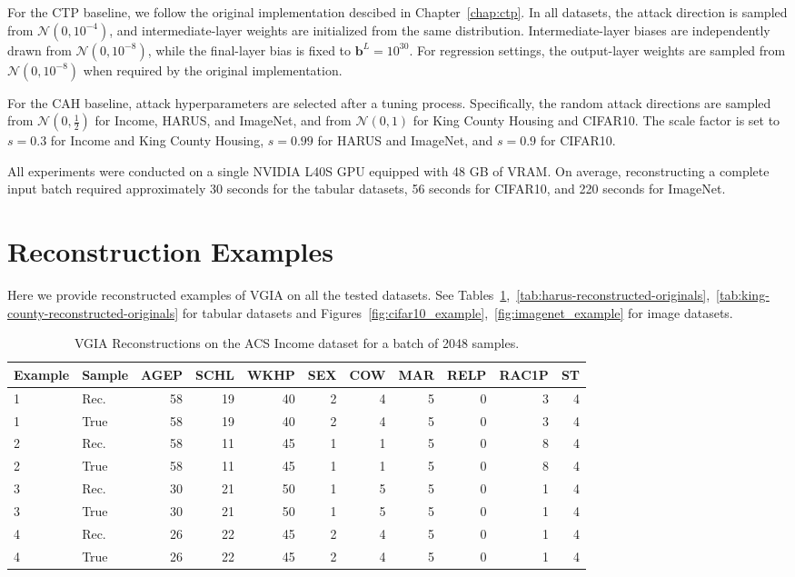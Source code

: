 For the CTP baseline, we follow the original implementation descibed in Chapter~\ref{chap:ctp}. In all datasets, the attack direction is sampled from $\mathcal{N}(0,10^{-4})$, and intermediate-layer weights are initialized from the same distribution. Intermediate-layer biases are independently drawn from $\mathcal{N}(0,10^{-8})$, while the final-layer bias is fixed to $\mathbf{b}^{L} = 10^{30}$. For regression settings, the output-layer weights are sampled from $\mathcal{N}(0,10^{-8})$ when required by the original implementation.

For the CAH baseline, attack hyperparameters are selected after a tuning process. Specifically, the random attack directions are sampled from $\mathcal{N}(0,\frac{1}{2})$ for Income, HARUS, and ImageNet, and from $\mathcal{N}(0,1)$ for King County Housing and CIFAR10. The scale factor is set to $s=0.3$ for Income and King County Housing, $s=0.99$ for HARUS and ImageNet, and $s=0.9$ for CIFAR10.

All experiments were conducted on a single NVIDIA L40S GPU equipped with 48 GB of VRAM. On average, reconstructing a complete input batch required approximately 30 seconds for the tabular datasets, 56 seconds for CIFAR10, and 220 seconds for ImageNet.


\section{Reconstruction Examples}\label{app:examples}
Here we provide reconstructed examples of VGIA on all the tested datasets. See Tables~\ref{tab:income-reconstructed-originals},~\ref{tab:harus-reconstructed-originals},~\ref{tab:king-county-reconstructed-originals} for tabular datasets and Figures~\ref{fig:cifar10_example},~\ref{fig:imagenet_example} for image datasets.

\begin{table}[h]
\caption{VGIA Reconstructions on the ACS Income dataset for a batch of 2048 samples.}
\centering
\small
\begin{tabular}{llrrrrrrrrr}
\toprule
Example & Sample & AGEP & SCHL & WKHP & SEX & COW & MAR & RELP & RAC1P & ST \\
\midrule
1 & Rec.      & 58 & 19 & 40 & 2 & 4 & 5 & 0 & 3 & 4 \\
1 & True & 58 & 19 & 40 & 2 & 4 & 5 & 0 & 3 & 4 \\
\midrule
2 & Rec.      & 58 & 11 & 45 & 1 & 1 & 5 & 0 & 8 & 4 \\
2 & True & 58 & 11 & 45 & 1 & 1 & 5 & 0 & 8 & 4 \\
\midrule
3 & Rec.      & 30 & 21 & 50 & 1 & 5 & 5 & 0 & 1 & 4 \\
3 & True & 30 & 21 & 50 & 1 & 5 & 5 & 0 & 1 & 4 \\
\midrule
4 & Rec.      & 26 & 22 & 45 & 2 & 4 & 5 & 0 & 1 & 4 \\
4 & True & 26 & 22 & 45 & 2 & 4 & 5 & 0 & 1 & 4 \\
\bottomrule
\end{tabular}
\label{tab:income-reconstructed-originals}
\end{table}


